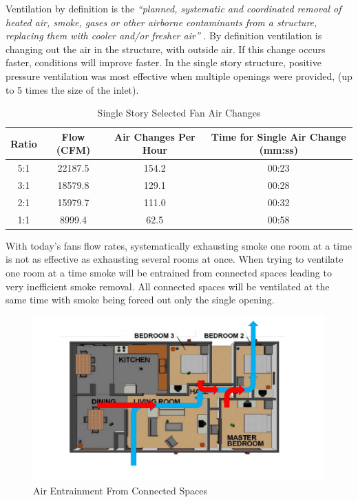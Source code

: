 \documentclass{article}
\begin{document}
Ventilation by definition is the \textit{``planned, systematic and coordinated removal of heated air, smoke, gases or other airborne contaminants from a structure, replacing them with cooler and/or fresher air''} \cite{Essentials6}. By definition ventilation is changing out the air in the structure, with outside air. If this change occurs faster, conditions will improve faster. In the single story structure, positive pressure ventilation was most effective when multiple openings were provided, (up to 5 times the size of the inlet). 

\begin{table}[H]
	\centering
	\caption{Single Story Selected Fan Air Changes}
	\begin{tabular}{|c|c|c|c|}
		\hline
		Ratio & Flow (CFM) & Air Changes Per Hour & Time for Single Air Change (mm:ss) \\ \hline \hline
		5:1 & 22187.5 & 154.2 & 00:23 \\ \hline
		3:1 & 18579.8 & 129.1 & 00:28 \\ \hline
		2:1 & 15979.7 & 111.0 & 00:32 \\ \hline
		1:1 & 8999.4 & 62.5 & 00:58 \\ \hline
	\end{tabular}
	\label{tab:SingleStoryAirChanges}
\end{table}

With today’s fans flow rates, systematically exhausting smoke one room at a time is not as effective as exhausting several rooms at once.  When trying to ventilate one room at a time smoke will be entrained from connected spaces leading to very inefficient smoke removal.  All connected spaces will be ventilated at the same time with smoke being forced out only the single opening.

\begin{figure} [H]
	\centering
	\includegraphics[width = 5in]{0_Images/Tactical_Considerations/Systematic_Vs_Non-Systematic/EntrainedAir.pdf}
	\caption{Air Entrainment From Connected Spaces}
\end{figure}
\end{document}
